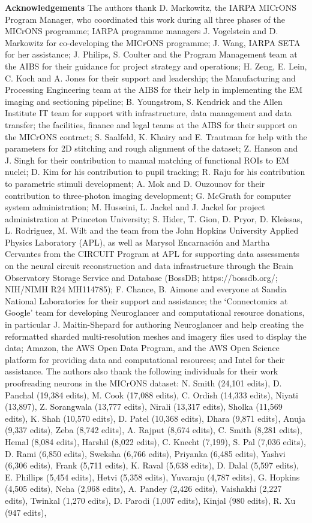 \documentclass{article}
\begin{document}
\textbf{Acknowledgements }The authors thank D. Markowitz, the IARPA MICrONS Program Manager, who coordinated this work during all three phases of the MICrONS programme; IARPA programme managers J. Vogelstein and D. Markowitz for co-developing the MICrONS programme; J. Wang, IARPA SETA for her assistance; J. Philips, S. Coulter and the Program Management team at the AIBS for their guidance for project strategy and operations; H. Zeng, E. Lein, C. Koch and A. Jones for their support and leadership; the Manufacturing and Processing Engineering team at the AIBS for their help in implementing the EM imaging and sectioning pipeline; B. Youngstrom, S. Kendrick and the Allen Institute IT team for support with infrastructure, data management and data transfer; the facilities, finance and legal teams at the AIBS for their support on the MICrONS contract; S. Saalfeld, K. Khairy and E. Trautman for help with the parameters for 2D stitching and rough alignment of the dataset; Z. Hanson and J. Singh for their contribution to manual matching of functional ROIs to EM nuclei; D. Kim for his contribution to pupil tracking; R. Raju for his contribution to parametric stimuli development; A. Mok and D. Ouzounov for their contribution to three-photon imaging development; G. McGrath for computer system administration; M. Husseini, L. Jackel and J. Jackel for project administration at Princeton University; S. Hider, T. Gion, D. Pryor, D. Kleissas, L. Rodriguez, M. Wilt and the team from the John Hopkins University Applied Physics Laboratory (APL), as well as Marysol Encarnación and Martha Cervantes from the CIRCUIT Program at APL for supporting data assessments on the neural circuit reconstruction and data infrastructure through the Brain Observatory Storage Service and Database (BossDB; https://bossdb.org/; NIH/NIMH R24 MH114785); F. Chance, B. Aimone and everyone at Sandia National Laboratories for their support and assistance; the ‘Connectomics at Google’ team for developing Neuroglancer and computational resource donations, in particular J. Maitin-Shepard for authoring Neuroglancer and help creating the reformatted sharded multi-resolution meshes and imagery files used to display the data; Amazon, the AWS Open Data Program, and the AWS Open Science platform for providing data and computational resources; and Intel for their assistance. The authors also thank the following individuals for their work proofreading neurons in the MICrONS dataset: N. Smith (24,101 edits), D. Panchal (19,384 edits), M. Cook (17,088 edits), C. Ordish (14,333 edits), Niyati (13,897), Z. Sorangwala (13,777 edits), Nirali (13,317 edits), Sholka (11,569 edits), K. Shah (10,570 edits), D. Patel (10,368 edits), Dhara (9,871 edits), Anuja (9,337 edits), Zeba (8,742 edits), A. Rajput (8,674 edits), C. Smith (8,281 edits), Hemal (8,084 edits), Harshil (8,022 edits), C. Knecht (7,199), S. Pal (7,036 edits), D. Rami (6,850 edits), Sweksha (6,766 edits), Priyanka (6,485 edits), Yashvi (6,306 edits), Frank (5,711 edits), K. Raval (5,638 edits), D. Dalal (5,597 edits), E. Phillips (5,454 edits), Hetvi (5,358 edits), Yuvaraju (4,787 edits), G. Hopkins (4,505 edits), Neha (2,968 edits), A. Pandey (2,426 edits), Vaishakhi (2,227 edits), Twinkal (1,270 edits), D. Parodi (1,007 edits), Kinjal (980 edits), R. Xu (947 edits), 
\end{document}
